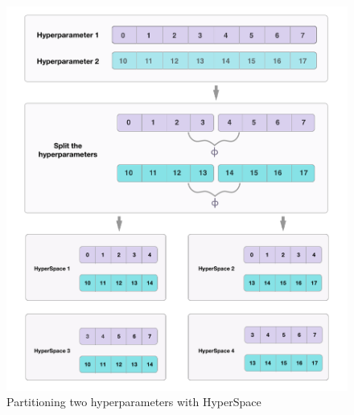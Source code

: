 \begin{figure}[H]
	\centering
	\includegraphics[scale=0.43]{figures/hyperspace-example.png}
	\caption{Partitioning two hyperparameters with HyperSpace}
	\label{fig:hspex}
\end{figure}
